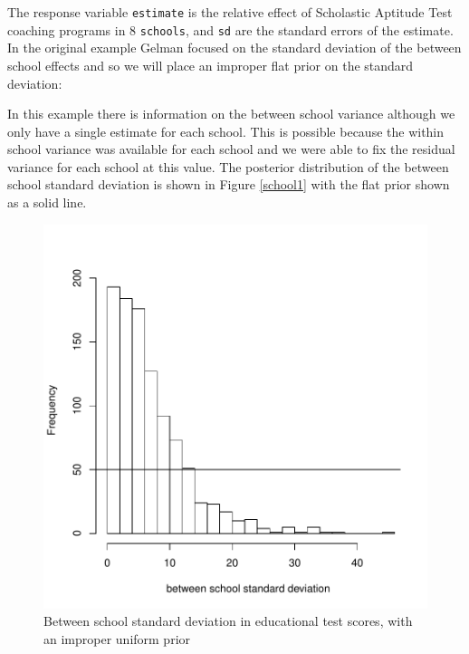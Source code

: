 \documentclass{article}
\begin{document}
The response variable \texttt{estimate} is the relative effect of Scholastic Aptitude Test coaching programs in 8 \texttt{schools}, and \texttt{sd} are the standard errors of the estimate. In the original example Gelman focused on the standard deviation of the between school effects and so we will place an improper flat prior on the standard deviation:  

\begin{Schunk}
\end{Schunk}

In this example there is information on the between school variance although we only have a single estimate for each school. This is possible because the within school variance was available for each school and we were able to fix the residual variance for each school at this value. The posterior distribution of the between school standard deviation is shown in Figure \ref{school1} with the flat prior shown as a solid line.\\ 


\begin{figure}[!h]
\begin{center}
\includegraphics{Lecture8-011}
\end{center}
\caption{Between school standard deviation in educational test scores, with an improper uniform prior}
\label{school1-fig}
\end{figure}
\end{document}
